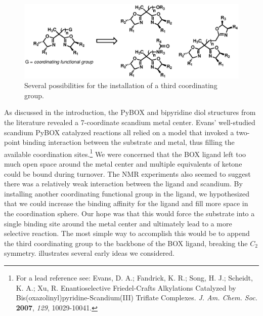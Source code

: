\begin{figure}[b]
\centering
\includegraphics[scale=0.8]{chp_asymmetric/images/coordinationsitehypothesis}
  \caption{Several possibilities for the installation of a third coordinating group.}
  \label{fig:coordinationsitehypothesis}
\end{figure}
As discussed in the introduction, the PyBOX and bipyridine diol
structures from the literature revealed a 7-coordinate scandium
metal center.
Evans' well-studied scandium PyBOX catalyzed reactions all relied on a model that invoked a
two-point binding interaction between the substrate and metal, thus filling the available
coordination sites.\footnote{For a lead reference see:
{\frenchspacing Evans, D. A.; Fandrick, K. R.; Song, H. J.; Scheidt, K. A.; Xu, R. Enantioselective
Friedel-Crafts Alkylations Catalyzed by Bis(oxazolinyl)pyridine-Scandium(III) Triflate Complexes. \textit{J. Am. Chem. Soc.} \textbf{2007},
\textit{129}, 10029-10041.}} We were concerned that the BOX ligand left too much open space around
the metal center and multiple equivalents of ketone could be bound during turnover. The NMR
experiments also seemed to suggest there was a relatively weak interaction between the ligand and
scandium.  By installing another coordinating functional group in the ligand, we hypothesized that we could increase the
binding affinity for the ligand and fill more space in the coordination sphere. Our hope was that
this would force the substrate into a single binding site around the metal center and ultimately
lead to a more selective reaction. The most simple way to accomplish this would be to append the
third coordinating group to the backbone of the BOX ligand, breaking the $C_2$ symmetry.
 illustrates several early ideas we considered. 


